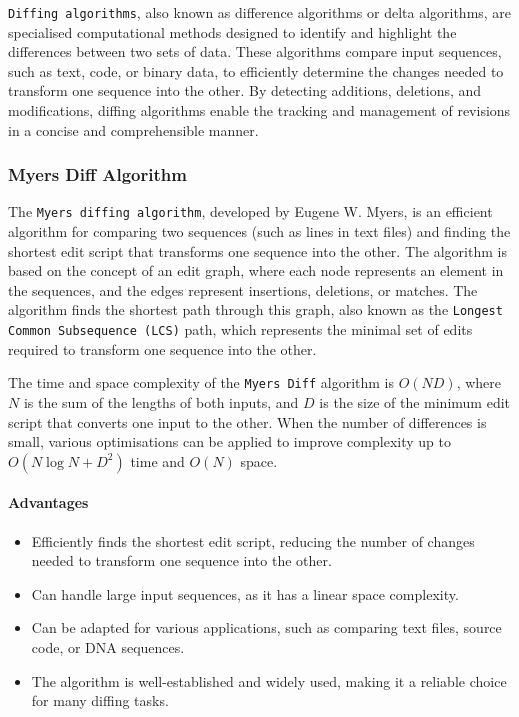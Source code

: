 \lstinline{Diffing algorithms}, also known as difference algorithms or delta algorithms, are specialised computational methods designed to identify and highlight the differences between two sets of data. These algorithms compare input sequences, such as text, code, or binary data, to efficiently determine the changes needed to transform one sequence into the other. By detecting additions, deletions, and modifications, diffing algorithms enable the tracking and management of revisions in a concise and comprehensible manner.

\subsubsection{Myers Diff Algorithm}
The \lstinline{Myers diffing algorithm}, developed by Eugene W. Myers, is an efficient algorithm for comparing two sequences (such as lines in text files) and finding the shortest edit script that transforms one sequence into the other. The algorithm is based on the concept of an edit graph, where each node represents an element in the sequences, and the edges represent insertions, deletions, or matches. The algorithm finds the shortest path through this graph, also known as the \lstinline{Longest Common Subsequence (LCS)} path, which represents the minimal set of edits required to transform one sequence into the other.
\smallskip

The time and space complexity of the \lstinline{Myers Diff} algorithm is $O(ND)$, where $N$ is the sum of the lengths of both inputs, and $D$ is the size of the minimum edit script that converts one input to the other. When the number of differences is small, various optimisations can be applied to improve complexity up to $O(N\log N + D^2)$ time and $O(N)$ space.


\paragraph{Advantages}
\begin{itemize}
    \item Efficiently finds the shortest edit script, reducing the number of changes needed to transform one sequence into the other.
    \item Can handle large input sequences, as it has a linear space complexity.
    \item Can be adapted for various applications, such as comparing text files, source code, or DNA sequences.
    \item The algorithm is well-established and widely used, making it a reliable choice for many diffing tasks.
\end{itemize}
